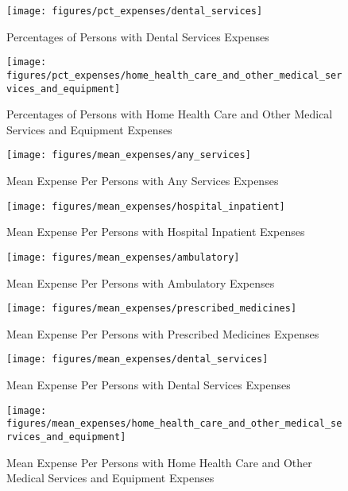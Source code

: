 \documentclass{ucetd}
\begin{document}
\begin{figure}[!ht]
\centering
\texttt{[image: figures/pct\_expenses/dental\_services]}
\caption{Percentages of Persons with Dental Services Expenses}
\label{fig:pct_expenses_dental_services}
\end{figure}

\begin{figure}[!ht]
\centering
\texttt{[image: figures/pct\_expenses/home\_health\_care\_and\_other\_medical\_services\_and\_equipment]}
\caption{Percentages of Persons with Home Health Care and Other Medical Services and Equipment Expenses}
\label{fig:pct_expenses_home_health_care_and_other_medical_services_and_equipment}
\end{figure}

\begin{figure}[!ht]
\centering
\texttt{[image: figures/mean\_expenses/any\_services]}
\caption{Mean Expense Per Persons with Any Services Expenses}
\label{fig:mean_expenses_any_services}
\end{figure}

\begin{figure}[!ht]
\centering
\texttt{[image: figures/mean\_expenses/hospital\_inpatient]}
\caption{Mean Expense Per Persons with Hospital Inpatient Expenses}
\label{fig:mean_expenses_hospital_inpatient}
\end{figure}

\begin{figure}[!ht]
\centering
\texttt{[image: figures/mean\_expenses/ambulatory]}
\caption{Mean Expense Per Persons with Ambulatory Expenses}
\label{fig:mean_expenses_ambulatory}
\end{figure}

\begin{figure}[!ht]
\centering
\texttt{[image: figures/mean\_expenses/prescribed\_medicines]}
\caption{Mean Expense Per Persons with Prescribed Medicines Expenses}
\label{fig:mean_expenses_prescribed_medicines}
\end{figure}

\begin{figure}[!ht]
\centering
\texttt{[image: figures/mean\_expenses/dental\_services]}
\caption{Mean Expense Per Persons with Dental Services Expenses}
\label{fig:mean_expenses_dental_services}
\end{figure}

\begin{figure}[!ht]
\centering
\texttt{[image: figures/mean\_expenses/home\_health\_care\_and\_other\_medical\_services\_and\_equipment]}
\caption{Mean Expense Per Persons with Home Health Care and Other Medical Services and Equipment Expenses}
\label{fig:mean_expenses_home_health_care_and_other_medical_services_and_equipment}
\end{figure}
\end{document}
